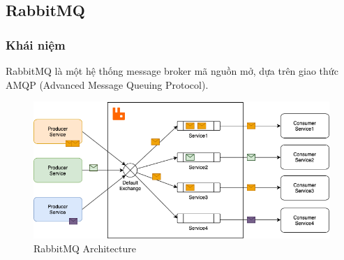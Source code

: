 \subsection{RabbitMQ}
\subsubsection{Khái niệm}
\indent RabbitMQ là một hệ thống message broker mã nguồn mở, dựa trên giao thức AMQP (Advanced Message Queuing Protocol).
 \begin{figure}[H]
    \begin{center}
    \includegraphics[scale = 0.5]{images/phat/rabbitMQ.png}
    \vspace*{7mm}
    \caption{RabbitMQ Architecture}
    \end{center}
    \label{}
\end{figure}
